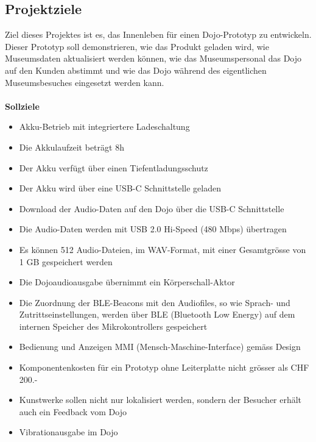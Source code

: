 \documentclass[10pt,a4paper,oneside]{99_fhnwreport}
\begin{document}
\subsection{Projektziele}
Ziel dieses Projektes ist es, das Innenleben für einen Dojo-Prototyp zu entwickeln. Dieser Prototyp soll demonstrieren, wie das Produkt geladen wird, wie Museumsdaten aktualisiert werden können, wie das Museumspersonal das Dojo auf den Kunden abstimmt und wie das Dojo während des eigentlichen Museumsbesuches eingesetzt werden kann.\\
\\
\textbf{Sollziele}
\begin{itemize}
\item{Akku-Betrieb mit integriertere Ladeschaltung}
\item{Die Akkulaufzeit beträgt 8h}
\item{Der Akku verfügt über einen Tiefentladungsschutz}
\item{Der Akku wird über eine USB-C Schnittstelle geladen}
\end{itemize}

\begin{itemize}
\item{Download der Audio-Daten auf den Dojo über die USB-C Schnittstelle}
\item{Die Audio-Daten werden mit USB 2.0 Hi-Speed (480 Mbps) übertragen}
\item{Es können 512 Audio-Dateien, im WAV-Format, mit einer Gesamtgrösse von 1 GB gespeichert werden}
\item{Die Dojoaudioausgabe übernimmt ein Körperschall-Aktor}
\end{itemize}

\begin{itemize}
\item{Die Zuordnung der BLE-Beacons mit den Audiofiles, so wie Sprach- und Zutrittseinstellungen, werden über BLE (Bluetooth Low Energy) auf dem internen Speicher des Mikrokontrollers gespeichert}
\end{itemize}

\begin{itemize}
\item{Bedienung und Anzeigen MMI (Mensch-Maschine-Interface) gemäss Design}
\item{Komponentenkosten für ein Prototyp ohne Leiterplatte nicht grösser als CHF 200.- }
\item{Kunstwerke sollen nicht nur lokalisiert werden, sondern der Besucher erhält auch ein Feedback vom Dojo}
\item{Vibrationausgabe im Dojo}
\end{itemize}
\end{document}
